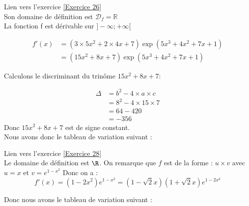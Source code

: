 \documentclass[12pt,fleqn]{report} %
\begin{document}
\begin{correction}Lien vers l'exercice   \ref{Exercice 26}\\
	Son domaine de définition est $\mathcal{D}_{f}=\mathbb{R}$
	\\
	La fonction f est dérivable sur $]-\infty;+\infty[$
	
	\begin{align*}
	f'(x) & =\left(3\times5x^2+2\times4x+7\right)\exp{\left(5x^3+4x^2+7x+1\right)} \\
	& = \left(15x^2+8x+7\right)\exp{\left(5x^3+4x^2+7x+1\right)}  
	\end{align*}
	
	Calculons le discriminant du trinôme $15x^2 + 8x + 7$:
	
	\begin{align*}
	\Delta & =b^2-4\times a\times c
	\\
	& =8^2-4\times15\times7  
	\\
	& =64-420
	\\
	& =-356 
	\end{align*}
	Donc $15x^2 + 8x + 7$ est de signe constant.
	\\
	Nous avons donc le tableau de variation suivant :
	
	\begin{center}
	\end{center}
\end{correction}
\begin{correction}Lien vers l'exercice   \ref{Exercice 28}\\
	Le domaine de définition est $\R$.
	On remarque que $f$ est de la forme : $ u\times v$ avec $u = x$ et $v = e^{1-x^2}$
	Donc on a :
	\[f'(x) = (1-2x^2)e^{1-x^2}  = (1 - \sqrt{2}x)(1 + \sqrt{2}x)e^{1-2x^2}\]
	
	Donc nous avons le tableau de variation suivant : 
	
	\begin{center}
	\end{center}	
\end{correction}
\end{document}
